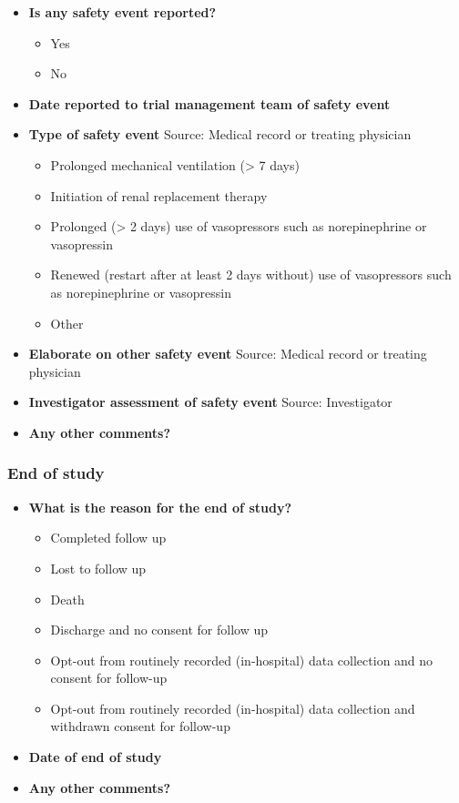 \documentclass[
]{scrartcl}
\providecommand{\tightlist}{%
  \setlength{\itemsep}{0pt}\setlength{\parskip}{0pt}}\usepackage{longtable,booktabs,array}
\begin{document}
\begin{itemize}
\item
  \textbf{Is any safety event reported?}

  \begin{itemize}
  \tightlist
  \item
    Yes
  \item
    No
  \end{itemize}
\item
  \textbf{Date reported to trial management team of safety event}
\item
  \textbf{Type of safety event} Source: Medical record or treating
  physician

  \begin{itemize}
  \tightlist
  \item
    Prolonged mechanical ventilation (\textgreater{} 7 days)
  \item
    Initiation of renal replacement therapy
  \item
    Prolonged (\textgreater{} 2 days) use of vasopressors such as
    norepinephrine or vasopressin
  \item
    Renewed (restart after at least 2 days without) use of vasopressors
    such as norepinephrine or vasopressin
  \item
    Other
  \end{itemize}
\item
  \textbf{Elaborate on other safety event} Source: Medical record or
  treating physician
\item
  \textbf{Investigator assessment of safety event} Source: Investigator
\item
  \textbf{Any other comments?}
\end{itemize}

\subsubsection{End of study}\label{end-of-study}

\begin{itemize}
\item
  \textbf{What is the reason for the end of study?}

  \begin{itemize}
  \tightlist
  \item
    Completed follow up
  \item
    Lost to follow up
  \item
    Death
  \item
    Discharge and no consent for follow up
  \item
    Opt-out from routinely recorded (in-hospital) data collection and no
    consent for follow-up
  \item
    Opt-out from routinely recorded (in-hospital) data collection and
    withdrawn consent for follow-up
  \end{itemize}
\item
  \textbf{Date of end of study}
\item
  \textbf{Any other comments?}
\end{itemize}
\end{document}
